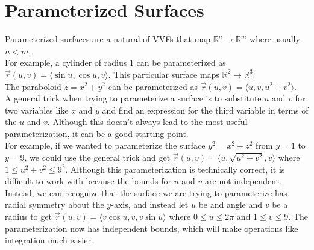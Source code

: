 \section{Parameterized Surfaces}
\noindent
Parameterized surfaces are a natural of VVFs that map $\mathbb{R}^n \to \mathbb{R}^m$ where usually $n<m$.\\

\noindent
For example, a cylinder of radius 1 can be parameterized as $\vec{r}(u,v) = \langle\sin{u}, \cos{u}, v\rangle$. This particular surface maps $\mathbb{R}^2 \to \mathbb{R}^3$.\\
The paraboloid $z = x^2 + y^2$ can be parameterized as $\vec{r}(u,v)=\langle u, v, u^2+v^2 \rangle$.\\

\noindent
A general trick when trying to parameterize a surface is to substitute $u$ and $v$ for two variables like $x$ and $y$ and find an expression for the third variable in terms of the $u$ and $v$. Although this doesn’t always lead to the most useful parameterization, it can be a good starting point.\\

\noindent
For example, if we wanted to parameterize the surface $y^2=x^2+z^2$ from $y=1$ to $y=9$, we could use the general trick and get $\vec{r}(u,v) = \langle u,\sqrt{u^2+v^2},v\rangle$ where $1\leq u^2+v^2\leq 9^2$. Although this parameterization is technically correct, it is difficult to work with because the bounds for $u$ and $v$ are not independent.\\
Instead, we can recognize that the surface we are trying to parameterize has radial symmetry about the $y$-axis, and instead let $u$ be and angle and $v$ be a radius to get $\vec{r}(u,v) = \langle v\cos{u}, v, v\sin{u}\rangle$ where $0\leq u\leq 2\pi$ and $1\leq v\leq 9$. The parameterization now has independent bounds, which will make operations like integration much easier.
